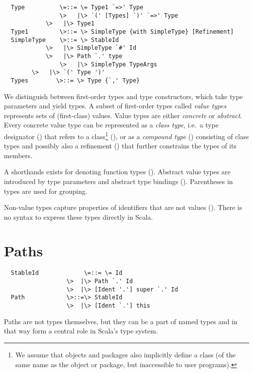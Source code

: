 \documentclass[11pt]{report}
\begin{document}
\syntax\begin{verbatim}
  Type          \=::= \= Type1 `=>' Type
                \>   |\> `(' [Types] `)' `=>' Type
	        \>   |\> Type1
  Type1         \>::= \> SimpleType {with SimpleType} [Refinement]
  SimpleType   	\>::= \> StableId
	        \>   |\> SimpleType `#' Id
	        \>   |\> Path `.' type
                \>   |\> SimpleType TypeArgs
		\>   |\> `(' Type ')'
  Types	       \>::= \> Type {`,' Type}
\end{verbatim}

We distinguish between first-order types and type constructors, which
take type parameters and yield types. A subset of first-order types
called {\em value types} represents sets of (first-class) values.
Value types are either {\em concrete} or {\em abstract}. Every
concrete value type can be represented as a {\em class type}, i.e.\ a
type designator () that refers to a 
class\footnote{We assume that objects and packages also
implicitly define a class (of the same name as the object or package,
but inaccessible to user programs).} (), 
or as a {\em compound type} () 
consisting of class types and possibly
also a refinement () that further constrains the
types of its members.

A shorthands exists for denoting function types
().  Abstract value types are introduced by
type parameters and abstract type bindings ().
Parentheses in types are used for grouping.

Non-value types capture properties of
identifiers that are not values
().  There is no syntax to express these
types directly in Scala.

\section{Paths}\label{sec:paths}

\syntax\begin{verbatim}
  StableId             \=::= \= Id
                  \>  |\> Path `.' Id
                  \>  |\> [Ident '.'] super `.' Id
  Path            \>::=\> StableId
                  \>  |\> [Ident `.'] this
\end{verbatim}

Paths are not types themselves, but they can be a part of named types
and in that way form a central role in Scala's type system.
\end{document}
